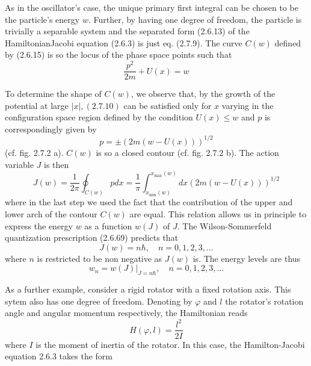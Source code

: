\documentclass{article}
\begin{document}
As in the oscillator's case, the unique primary first integral can be chosen to be the particle's energy $w$. Further, by having one degree of freedom, the particle is
trivially a separable system and the separated form (2.6.13) of the HamiltonianJacobi equation (2.6.3) is just eq. (2.7.9). The curve $C(w)$ defined by (2.6.15) is so the locus of the phase space points such that
$$
\begin{equation*}
\frac{p^{2}}{2 m}+U(x)=w \tag{2.7.10}
\end{equation*}
$$

To determine the shape of $C(w)$, we observe that, by the growth of the potential at large $|x|,(2.7 .10)$ can be satisfied only for $x$ varying in the configuration space region defined by the condition $U(x) \leq w$ and $p$ is correspondingly given by
$$
\begin{equation*}
p= \pm(2 m(w-U(x)))^{1 / 2} \tag{2.7.11}
\end{equation*}
$$
(cf. fig. 2.7.2 a). $C(w)$ is so a closed contour (cf. fig. 2.7.2 b). The action variable $J$ is then
$$
\begin{equation*}
J(w)=\frac{1}{2 \pi} \oint_{C(w)} p d x=\frac{1}{\pi} \int_{x_{\min }(w)}^{x_{\max }(w)} d x(2 m(w-U(x)))^{1 / 2} \tag{2.7.12}
\end{equation*}
$$
where in the last step we used the fact that the contribution of the upper and lower arch of the contour $C(w)$ are equal. This relation allows us in principle to express the energy $w$ as a function $w(J)$ of $J$. The Wilson-Sommerfeld quantization prescription (2.6.69) predicts that
$$
\begin{equation*}
J(w)=n \hbar, \quad n=0,1,2,3, \ldots \tag{2.7.13}
\end{equation*}
$$
where $n$ is restricted to be non negative as $J(w)$ is. The energy levels are thus
$$
\begin{equation*}
w_{n}=\left.w(J)\right|_{J=n \hbar}, \quad n=0,1,2,3, \ldots \tag{2.7.14}
\end{equation*}
$$

As a further example, consider a rigid rotator with a fixed rotation axis. This sytem also has one degree of freedom. Denoting by $\varphi$ and $l$ the rotator's rotation angle and angular momentum respectively, the Hamiltonian reads
$$
\begin{equation*}
H(\varphi, l)=\frac{l^{2}}{2 I} \tag{2.7.15}
\end{equation*}
$$
where $I$ is the moment of inertia of the rotator. In this case, the Hamilton-Jacobi equation 2.6.3 takes the form
\end{document}
